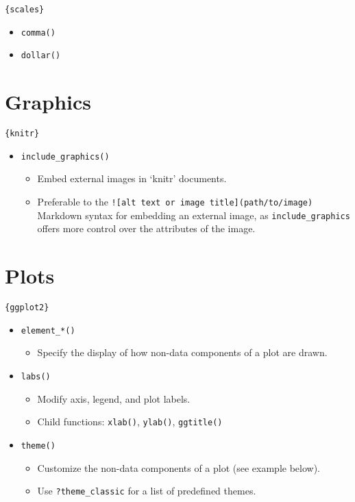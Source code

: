 \documentclass[
]{book}
\providecommand{\tightlist}{%
  \setlength{\itemsep}{0pt}\setlength{\parskip}{0pt}}
\begin{document}
\texttt{\{scales\}}

\begin{itemize}
\tightlist
\item
  \texttt{comma()}
\item
  \texttt{dollar()}
\end{itemize}

\hypertarget{graphics}{%
\section{Graphics}\label{graphics}}

\texttt{\{knitr\}}

\begin{itemize}
\tightlist
\item
  \texttt{include\_graphics()}

  \begin{itemize}
  \tightlist
  \item
    Embed external images in `knitr' documents.
  \item
    Preferable to the \texttt{!{[}alt\ text\ or\ image\ title{]}(path/to/image)} Markdown syntax for embedding an external image, as \texttt{include\_graphics} offers more control over the attributes of the image.
  \end{itemize}
\end{itemize}

\hypertarget{plots}{%
\section{Plots}\label{plots}}

\texttt{\{ggplot2\}}

\begin{itemize}
\tightlist
\item
  \texttt{element\_*()}

  \begin{itemize}
  \tightlist
  \item
    Specify the display of how non-data components of a plot are drawn.
  \end{itemize}
\item
  \texttt{labs()}

  \begin{itemize}
  \tightlist
  \item
    Modify axis, legend, and plot labels.
  \item
    Child functions: \texttt{xlab()}, \texttt{ylab()}, \texttt{ggtitle()}
  \end{itemize}
\item
  \texttt{theme()}

  \begin{itemize}
  \tightlist
  \item
    Customize the non-data components of a plot (see example below).
  \item
    Use \texttt{?theme\_classic} for a list of predefined themes.
  \end{itemize}
\end{itemize}
\end{document}

